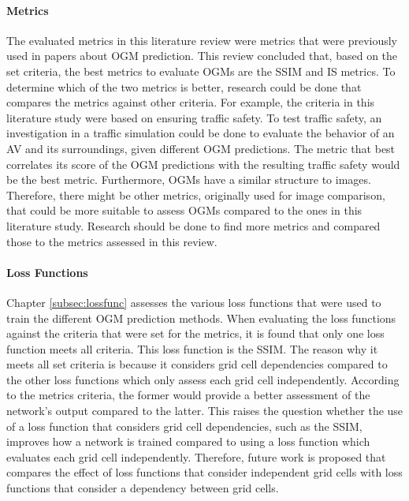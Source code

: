 \paragraph{Metrics}
The evaluated metrics in this literature review were metrics that were previously used in papers about \gls{OGM} prediction. This review concluded that, based on the set criteria, the best metrics to evaluate \glspl{OGM} are the \gls{SSIM} and \gls{IS} metrics. To determine which of the two metrics is better, research could be done that compares the metrics against other criteria. For example, the criteria in this literature study were based on ensuring traffic safety. To test traffic safety, an investigation in a traffic simulation could be done to evaluate the behavior of an \gls{AV} and its surroundings, given different \gls{OGM} predictions. The metric that best correlates its score of the \gls{OGM} predictions with the resulting traffic safety would be the best metric. 
Furthermore, \glspl{OGM} have a similar structure to images. Therefore, there might be other metrics, originally used for image comparison, that could be more suitable to assess \glspl{OGM} compared to the ones in this literature study. Research should be done to find more metrics and compared those to the metrics assessed in this review. 

\paragraph{Loss Functions}
Chapter \ref{subsec:lossfunc} assesses the various loss functions that were used to train the different \gls{OGM} prediction methods. When evaluating the loss functions against the criteria that were set for the metrics, it is found that only one loss function meets all criteria. This loss function is the \gls{SSIM}. The reason why it meets all set criteria is because it considers grid cell dependencies compared to the other loss functions which only assess each grid cell independently. According to the metrics criteria, the former would provide a better assessment of the network's output compared to the latter. This raises the question whether the use of a loss function that considers grid cell dependencies, such as the \gls{SSIM}, improves how a network is trained compared to using a loss function which evaluates each grid cell independently. Therefore, future work is proposed that compares the effect of loss functions that consider independent grid cells with loss functions that consider a dependency between grid cells. 


